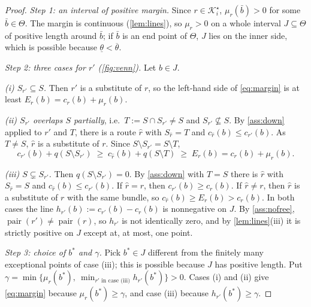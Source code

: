 \documentclass[11pt]{article}
\theoremstyle{definition}
\theoremstyle{remark}
\newcommand{\Ks}{\mathcal{K}^{\star}}
\newcommand{\thl}{\underline{\theta}}
\newcommand{\thu}{\overline{\theta}}
\newcommand{\pair}{\operatorname{pair}}
\begin{document}
\begin{proof}
\emph{Step 1: an interval of positive margin.} Since $r\in\Ks_i$,
$\mu_r(\bar b)>0$ for some $\bar b\in\Theta$. The margin is continuous
(\cref{lem:lines}), so $\mu_r>0$ on a whole interval $J\subseteq\Theta$ of
positive length around $\bar b$; if $\bar b$ is an end point of $\Theta$, $J$
lies on the inner side, which is possible because $\thl<\thu$.

\emph{Step 2: three cases for $r'$ (\cref{fig:venn}).} Let $b\in J$.

\noindent\emph{(i) $S_{r'}\subseteq S$.} Then $r'$ is a substitute of $r$, so
the left-hand side of \eqref{eq:margin} is at least $E_r(b)=c_r(b)+\mu_r(b)$.

\noindent\emph{(ii) $S_{r'}$ overlaps $S$ partially}, i.e.\
$T:=S\cap S_{r'}\ne S$ and $S_{r'}\not\subseteq S$. By \cref{ass:down} applied
to $r'$ and $T$, there is a route $\hat r$ with $S_{\hat r}=T$ and
$c_{\hat r}(b)\le c_{r'}(b)$. As $T\ne S$, $\hat r$ is a substitute of $r$.
Since $S\setminus S_{r'}=S\setminus T$,
\[
c_{r'}(b)+q(S\setminus S_{r'})\;\ge\;c_{\hat r}(b)+q(S\setminus T)\;\ge\;E_r(b)=c_r(b)+\mu_r(b).
\]

\noindent\emph{(iii) $S\subsetneq S_{r'}$.} Then $q(S\setminus S_{r'})=0$. By
\cref{ass:down} with $T=S$ there is $\hat r$ with $S_{\hat r}=S$ and
$c_{\hat r}(b)\le c_{r'}(b)$. If $\hat r=r$, then $c_{r'}(b)\ge c_r(b)$. If
$\hat r\ne r$, then $\hat r$ is a substitute of $r$ with the same bundle, so
$c_{\hat r}(b)\ge E_r(b)>c_r(b)$. In both cases the line
$h_{r'}(b):=c_{r'}(b)-c_r(b)$ is nonnegative on $J$. By \cref{ass:nofree},
$\pair(r')\ne\pair(r)$, so $h_{r'}$ is not identically zero, and by
\cref{lem:lines}(iii) it is strictly positive on $J$ except at, at most, one
point.

\emph{Step 3: choice of $b^*$ and $\gamma$.} Pick $b^*\in J$ different from the
finitely many exceptional points of case (iii); this is possible because $J$
has positive length. Put
$\gamma=\min\bigl\{\mu_r(b^*),\ \min_{r'\text{ in case (iii)}}h_{r'}(b^*)\bigr\}>0$.
Cases (i) and (ii) give \eqref{eq:margin} because $\mu_r(b^*)\ge\gamma$, and case
(iii) because $h_{r'}(b^*)\ge\gamma$.
\end{proof}
\end{document}
